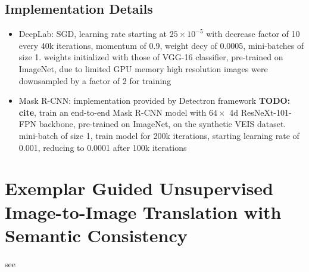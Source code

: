 \documentclass[]{article}
\newcommand{\todo}[1]{{\color{red}\bf{TODO: #1}}}
\begin{document}
\subsection{Implementation Details}
\begin{itemize}
	\item DeepLab: SGD, learning rate starting at $25 \times 10^{-5}$ with decrease factor of 10 every 40k iterations, momentum of 0.9, weight decy of 0.0005, mini-batches of size 1. weights initialized with those of VGG-16 classifier, pre-trained on ImageNet, due to limited GPU memory high resolution images were downsampled by a factor of 2 for training
	\item Mask R-CNN: implementation provided by Detectron framework \todo{cite}, train an end-to-end Mask R-CNN model with $64 \times $ 4d ResNeXt-101-FPN backbone, pre-trained on ImageNet, on the synthetic VEIS dataset. mini-batch of size 1, train model for 200k iterations, starting learning rate of 0.001, reducing to 0.0001 after 100k iterations
\end{itemize}


\section{Exemplar Guided Unsupervised Image-to-Image Translation with Semantic Consistency}

see \cite{DBLP:journals/corr/abs-1805-11145}
\end{document}

